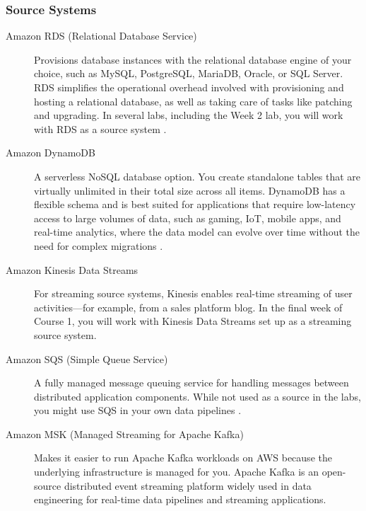 \documentclass{article}
\begin{document}
\subsubsection{Source Systems}
\begin{description}
    \item[Amazon RDS (Relational Database Service)] Provisions database instances with the relational database engine of your choice, such as MySQL, PostgreSQL, MariaDB, Oracle, or SQL Server. RDS simplifies the operational overhead involved with provisioning and hosting a relational database, as well as taking care of tasks like patching and upgrading. In several labs, including the Week 2 lab, you will work with RDS as a source system \cite{aws2023rds}.

    \item[Amazon DynamoDB] A serverless NoSQL database option. You create standalone tables that are virtually unlimited in their total size across all items. DynamoDB has a flexible schema and is best suited for applications that require low-latency access to large volumes of data, such as gaming, IoT, mobile apps, and real-time analytics, where the data model can evolve over time without the need for complex migrations \cite{aws2023dynamodb}.

    \item[Amazon Kinesis Data Streams] For streaming source systems, Kinesis enables real-time streaming of user activities---for example, from a sales platform blog. In the final week of Course 1, you will work with Kinesis Data Streams set up as a streaming source system.

    \item[Amazon SQS (Simple Queue Service)] A fully managed message queuing service for handling messages between distributed application components. While not used as a source in the labs, you might use SQS in your own data pipelines \cite{aws2023sqs}.

    \item[Amazon MSK (Managed Streaming for Apache Kafka)] Makes it easier to run Apache Kafka workloads on AWS because the underlying infrastructure is managed for you. Apache Kafka \cite{narkhede2017kafka} is an open-source distributed event streaming platform widely used in data engineering for real-time data pipelines and streaming applications.
\end{description}
\end{document}
